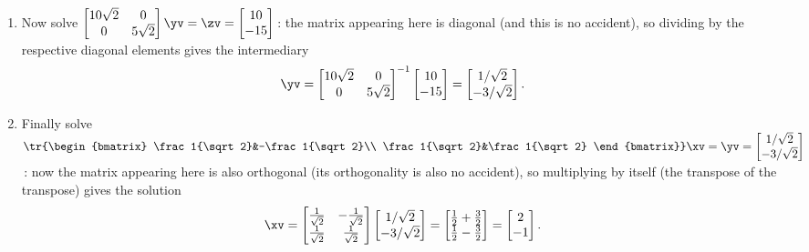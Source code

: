 \begin{example}
\begin{solution}
\begin{enumerate}
\item Now solve \(\begin{bmatrix} 10\sqrt2&0\\0&5\sqrt2 \end{bmatrix}\yv=\zv=\begin{bmatrix} 10\\-15 \end{bmatrix}\)\,:  the matrix appearing here is diagonal (and this is no accident), so dividing by the respective diagonal elements gives the intermediary
\begin{equation*}
\yv=\begin{bmatrix} 10\sqrt2&0\\0&5\sqrt2 \end{bmatrix}^{-1}
\begin{bmatrix} 10\\-15 \end{bmatrix}
=\begin{bmatrix} 1/\sqrt2\\-3/\sqrt2 \end{bmatrix}.
\end{equation*}

\item Finally solve \(\tr{\begin{bmatrix} \frac1{\sqrt2}&-\frac1{\sqrt2}\\ \frac1{\sqrt2}&\frac1{\sqrt2} \end{bmatrix}}\xv=\yv=\begin{bmatrix} 1/\sqrt2\\-3/\sqrt2 \end{bmatrix}\)\,: now the matrix appearing here is also orthogonal (its orthogonality is also no accident), so multiplying by itself (the transpose of the transpose) gives the solution
\begin{equation*}
\xv=\begin{bmatrix} \frac1{\sqrt2}&-\frac1{\sqrt2}\\ \frac1{\sqrt2}&\frac1{\sqrt2} \end{bmatrix}
\begin{bmatrix} 1/\sqrt2\\-3/\sqrt2 \end{bmatrix}
=\begin{bmatrix} \frac12+\frac32\\\frac12-\frac32 \end{bmatrix}
=\begin{bmatrix} 2\\-1 \end{bmatrix}.
\end{equation*}

\end{enumerate}
\end{solution}
\end{example}






